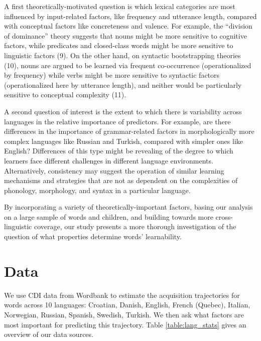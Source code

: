 \documentclass[9pt,twocolumn,twoside]{pnas-new}
\begin{document}
A first theoretically-motivated question is which lexical categories are
most influenced by input-related factors, like frequency and utterance
length, compared with conceptual factors like concreteness and valence.
For example, the ``division of dominance'' theory suggests that nouns
might be more sensitive to cognitive factors, while predicates and
closed-class words might be more sensitive to linguistic factors (9). On
the other hand, on syntactic bootstrapping theories (10), nouns are
argued to be learned via frequent co-occurrence (operationalized by
frequency) while verbs might be more sensitive to syntactic factors
(operationalized here by utterance length), and neither would be
particularly sensitive to conceptual complexity (11).

A second question of interest is the extent to which there is
variability across languages in the relative importance of predictors.
For example, are there differences in the importance of grammar-related
factors in morphologically more complex languages like Russian and
Turkish, compared with simpler ones like English? Differences of this
type might be revealing of the degree to which learners face different
challenges in different language environments. Alternatively,
consistency may suggest the operation of similar learning mechanisms and
strategies that are not as dependent on the complexities of phonology,
morphology, and syntax in a particular language.

By incorporating a variety of theoretically-important factors, basing
our analysis on a large sample of words and children, and building
towards more cross-linguistic coverage, our study presents a more
thorough investigation of the question of what properties determine
words' learnability.

\section*{Data}\label{data}

We use CDI data from Wordbank to estimate the acquisition trajectories
for words across 10 languages: Croatian, Danish, English, French
(Quebec), Italian, Norwegian, Russian, Spanish, Swedish, Turkish. We
then ask what factors are most important for predicting this trajectory.
Table \ref{table:lang_stats} gives an overview of our data sources.
\end{document}
